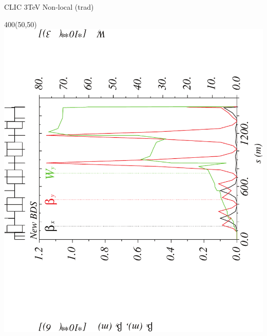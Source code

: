 \documentclass{beamer}
\begin{document}
\begin{frame}{CLIC 3TeV Non-local (trad)}
  \setlength{\TPHorizModule}{1pt}
  \setlength{\TPVertModule}{1pt}
 \begin{textblock}{400}(50,50)
 \includegraphics[scale=0.4,angle=-90]{CLICtrad_wy-crop.pdf}
 \end{textblock}
\end{frame}
\end{document}
